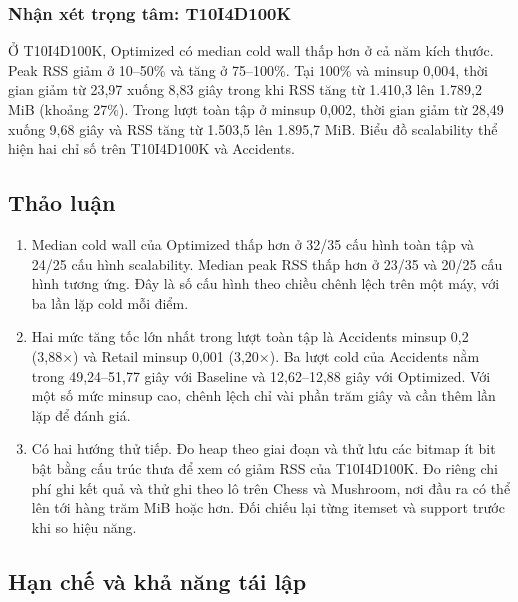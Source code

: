 \subsubsection{Nhận xét trọng tâm: T10I4D100K}

Ở T10I4D100K, Optimized có median cold wall thấp hơn ở cả năm kích thước. Peak RSS giảm ở 10--50\% và tăng ở 75--100\%. Tại 100\% và minsup 0,004, thời gian giảm từ 23,97 xuống 8,83 giây trong khi RSS tăng từ 1.410,3 lên 1.789,2 MiB (khoảng 27\%). Trong lượt toàn tập ở minsup 0,002, thời gian giảm từ 28,49 xuống 9,68 giây và RSS tăng từ 1.503,5 lên 1.895,7 MiB. Biểu đồ scalability thể hiện hai chỉ số trên T10I4D100K và Accidents.

\subsection{Thảo luận}

\begin{enumerate}
\def\labelenumi{\arabic{enumi}.}
\tightlist
\item
  Median cold wall của Optimized thấp hơn ở 32/35 cấu hình toàn tập và 24/25 cấu hình scalability. Median peak RSS thấp hơn ở 23/35 và 20/25 cấu hình tương ứng. Đây là số cấu hình theo chiều chênh lệch trên một máy, với ba lần lặp cold mỗi điểm.
\item
  Hai mức tăng tốc lớn nhất trong lượt toàn tập là Accidents minsup 0,2 (3,88×) và Retail minsup 0,001 (3,20×). Ba lượt cold của Accidents nằm trong 49,24--51,77 giây với Baseline và 12,62--12,88 giây với Optimized. Với một số mức minsup cao, chênh lệch chỉ vài phần trăm giây và cần thêm lần lặp để đánh giá.
\item
  Có hai hướng thử tiếp. Đo heap theo giai đoạn và thử lưu các bitmap ít bit bật bằng cấu trúc thưa để xem có giảm RSS của T10I4D100K. Đo riêng chi phí ghi kết quả và thử ghi theo lô trên Chess và Mushroom, nơi đầu ra có thể lên tới hàng trăm MiB hoặc hơn. Đối chiếu lại từng itemset và support trước khi so hiệu năng.
\end{enumerate}

\subsection{Hạn chế và khả năng tái lập}

